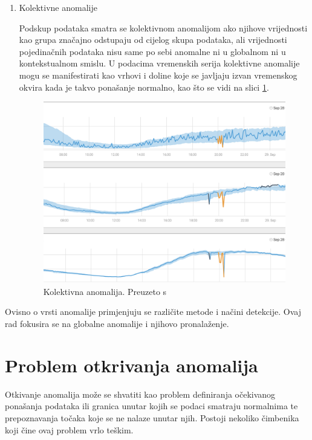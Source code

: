 \documentclass[utf8, diplomski, numeric]{fer}
\begin{document}
\begin{enumerate}
\item Kolektivne anomalije

Podskup podataka smatra se kolektivnom anomalijom ako njihove vrijednosti kao grupa značajno odstupaju od cijelog skupa podataka, ali vrijednosti pojedinačnih podataka nisu same po sebi anomalne ni u globalnom ni u kontekstualnom smislu. U podacima vremenskih serija kolektivne anomalije mogu se manifestirati kao vrhovi i doline koje se javljaju izvan vremenskog okvira kada je takvo ponašanje normalno, kao što se vidi na slici \ref{fig:outlier3}.

\begin{figure}[htb]
\includegraphics[width=1\textwidth]{images/outlier_type3.png}
\centering
\caption{Kolektivna anomalija. Preuzeto s  \cite{OutlierAnalysis}}
\label{fig:outlier3}
\end{figure}
\end{enumerate}

Ovisno o vrsti anomalije primjenjuju se različite metode i načini detekcije. Ovaj rad fokusira se na globalne anomalije i njihovo pronalaženje.

\section{Problem otkrivanja anomalija}
Otkivanje anomalija može se shvatiti kao problem definiranja očekivanog ponašanja podataka ili granica unutar kojih se podaci smatraju normalnima te prepoznavanja točaka koje se ne nalaze unutar njih. Postoji nekoliko čimbenika koji čine ovaj problem vrlo teškim.
\end{document}
